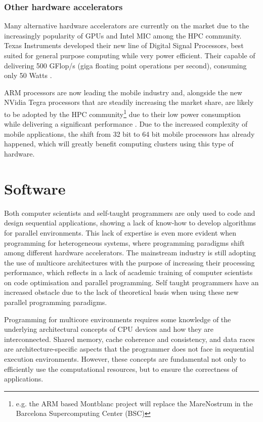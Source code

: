 \subsubsection*{Other hardware accelerators}
\label{other_accelerators}

Many alternative hardware accelerators are currently on the market due to the increasingly popularity of GPUs and Intel MIC among the HPC community. Texas Instruments developed their new line of Digital Signal Processors, best suited for general purpose computing while very power efficient. Their capable of delivering 500 GFlop/s (giga floating point operations per second), consuming only 50 Watts \cite{Texas:DSP}.

ARM processors are now leading the mobile industry and, alongside the new NVidia Tegra processors \cite{NVIDIA:Tegra} that are steadily increasing the market share, are likely to be adopted by the HPC community\footnote{e.g. the ARM based Montblanc project will replace the MareNostrum in the Barcelona Supercomputing Center (BSC)} due to their low power consumption while delivering a significant performance \cite{ARM}. Due to the increased complexity of mobile applications, the shift from 32 bit to 64 bit mobile processors has already happened, which will greatly benefit computing clusters using this type of hardware.

\section{Software}
\label{software}

Both computer scientists and self-taught programmers are only used to code and design sequential applications, showing a lack of know-how to develop algorithms for parallel environments. This lack of expertise is even more evident when programming for heterogeneous systems, where programming paradigms shift among different hardware accelerators. The mainstream industry is still adopting the use of multicore architectures with the purpose of increasing their processing performance, which reflects in a lack of academic training of computer scientists on code optimisation and parallel programming. Self taught programmers have an increased obstacle due to the lack of theoretical basis when using these new parallel programming paradigms.

Programming for multicore environments requires some knowledge of the underlying architectural concepts of CPU devices and how they are interconnected. Shared memory, cache coherence and consistency, and data races are architecture-specific aspects that the programmer does not face in sequential execution environments. However, these concepts are fundamental not only to efficiently use the computational resources, but to ensure the correctness of applications.

